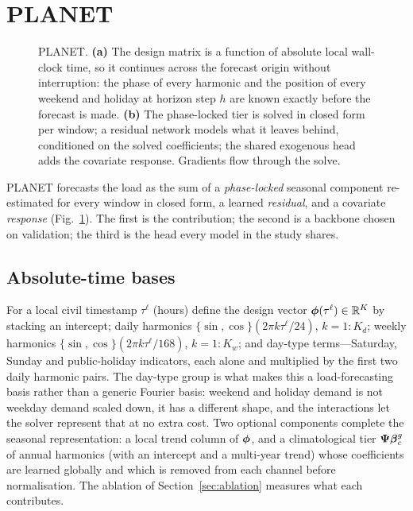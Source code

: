 \section{PLANET}
\label{sec:method}

\begin{figure}[!t]
\centering
{}
\caption{PLANET. \textbf{(a)} The design matrix is a function of absolute local wall-clock
time, so it continues across the forecast origin without interruption: the phase of every
harmonic and the position of every weekend and holiday at horizon step $h$ are known exactly
before the forecast is made. \textbf{(b)} The phase-locked tier is solved in closed form per
window; a residual network models what it leaves behind, conditioned on the solved
coefficients; the shared exogenous head adds the covariate response. Gradients flow through
the solve.}
\label{fig:arch}
\end{figure}

PLANET forecasts the load as the sum of a \emph{phase-locked} seasonal component re-estimated
for every window in closed form, a learned \emph{residual}, and a covariate \emph{response}
(Fig.~\ref{fig:arch}). The first is the contribution; the second is a backbone chosen on
validation; the third is the head every model in the study shares.

\subsection{Absolute-time bases}
\label{sec:basis}
For a local civil timestamp $\tau^{\ell}$ (hours) define the design vector
$\boldsymbol{\phi}(\tau^{\ell})\in\mathbb{R}^{K}$ by stacking an intercept; daily harmonics
$\{\sin,\cos\}(2\pi k\tau^{\ell}/24)$, $k=1{:}K_d$; weekly harmonics
$\{\sin,\cos\}(2\pi k\tau^{\ell}/168)$, $k=1{:}K_w$; and day-type terms---Saturday, Sunday and
public-holiday indicators, each alone and multiplied by the first two daily harmonic
pairs. The day-type group is what makes this a load-forecasting basis rather than a generic
Fourier basis: weekend and holiday demand is not weekday demand scaled down, it has a
different shape, and the interactions let the solver represent that at no extra cost. Two
optional components complete the seasonal representation: a local trend column of
$\boldsymbol{\phi}$, and a climatological tier $\boldsymbol{\Psi}\boldsymbol{\beta}^{g}_c$ of annual harmonics (with
an intercept and a multi-year trend) whose coefficients are learned globally and which is
removed from each channel before normalisation. The ablation of Section~\ref{sec:ablation}
measures what each contributes.

